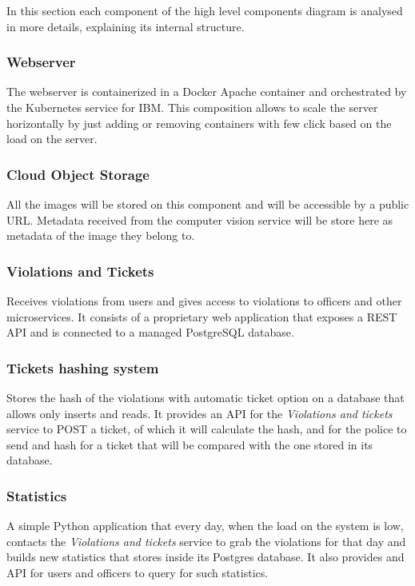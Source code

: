 In this section each component of the high level components diagram is analysed in more details, explaining
its internal structure.


\subsubsection{Webserver}
The webserver is containerized in a Docker Apache container and orchestrated by the Kubernetes service for IBM.
This composition allows to scale the server horizontally by just adding or removing containers with few click based on the load on the server.

\subsubsection{Cloud Object Storage}
All the images will be stored on this component and will be accessible by a public URL. Metadata received from the computer vision service will be store here as metadata of the image they belong to.

\subsubsection{Violations and Tickets}
Receives violations from users and gives access to violations to officers and other microservices. It consists of a proprietary web application that exposes a REST API and is connected to a managed PostgreSQL database.

\subsubsection{Tickets hashing system}
Stores the hash of the violations with automatic ticket option on a database that allows only inserts and reads.
It provides an API for the \textit{Violations and tickets} service to POST a ticket, of which it will calculate the hash,
and for the police to send and hash for a ticket that will be compared with the one stored in its database.

\subsubsection{Statistics}
A simple Python application that every day, when the load on the system is low, contacts the \textit{Violations and tickets} service to grab the violations for that day and builds new statistics that stores inside its Postgres database.
It also provides and API for users and officers to query for such statistics.

